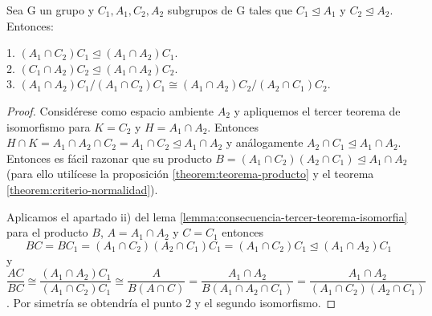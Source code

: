 \begin{lemma}
Sea G un grupo y $C_1,A_1,C_2,A_2$ subgrupos de G tales que $C_1 \trianglelefteq A_1$ y $C_2 \trianglelefteq A_2$. Entonces:

1. $(A_1 \cap C_2)C_1 \trianglelefteq (A_1 \cap A_2)C_1$.\\
2. $(C_1 \cap A_2)C_2 \trianglelefteq (A_1 \cap A_2)C_2$.\\
3. $(A_1 \cap A_2)C_1/(A_1 \cap C_2)C_1 \cong (A_1 \cap A_2)C_2/(A_2 \cap C_1)C_2$.
\end{lemma}
\begin{proof}
Considérese como espacio ambiente $A_2$ y apliquemos el tercer teorema de isomorfismo para $K = C_2$ y $H = A_1 \cap A_2$. Entonces $H \cap K = A_1 \cap A_2 \cap C_2 = A_1 \cap C_2 \trianglelefteq A_1 \cap A_2$ y análogamente $A_2 \cap C_1 \trianglelefteq A_1 \cap A_2$. Entonces es fácil razonar que su producto $B = (A_1 \cap C_2)(A_2 \cap C_1) \trianglelefteq A_1 \cap A_2$ (para ello utilícese la proposición \ref{theorem:teorema-producto} y el teorema \ref{theorem:criterio-normalidad}). 

Aplicamos el apartado ii) del lema \ref{lemma:consecuencia-tercer-teorema-isomorfia} para el producto $B$, $A = A_1 \cap A_2$ y $C = C_1$ entonces $$BC = BC_1 = (A_1 \cap C_2)(A_2 \cap C_1)C_1 = (A_1 \cap C_2)C_1 \trianglelefteq (A_1 \cap A_2)C_1$$ y $$\frac{AC}{BC} \cong \frac{(A_1 \cap A_2)C_1}{(A_1 \cap C_2)C_1} \cong \frac{A}{B(A \cap C)} = \frac{A_1 \cap A_2}{B(A_1 \cap A_2 \cap C_1)} = \frac{A_1 \cap A_2}{(A_1 \cap C_2)(A_2 \cap C_1)}$$. Por simetría se obtendría el punto 2 y el segundo isomorfismo.
\end{proof}

